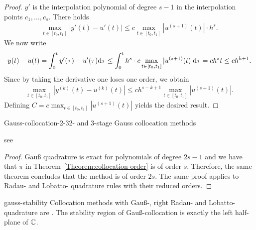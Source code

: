\begin{proof}
  $y'$ is the interpolation polynomial of degree $s-1$ in the interpolation
	points $c_1, \dots, c_s$. There holds
	\begin{gather*}
	\max_{t \in [t_0, t_1]} |y'(t) - u'(t)| \le c \max_{t \in [t_0, t_1]}
		|u^{(s+1)} (t)| \cdot h^s.
	\end{gather*}
	We now write
	\begin{gather*}
	y(t) - u(t) = \int_0 ^t y'(\tau) - u'(\tau) \mathrm{d} \tau \le \int_0 ^t h^s
		\cdot c \max_{t \in [t_0, t_1]} |u^{(s+1)} (t)| \mathrm{d} \tau = ch^s t
		\le ch^{h+1}.
	\end{gather*}
	Since by taking the derivative one loses one order, we obtain
	\begin{gather*}
	\max_{t \in [t_0, t_1]} |y^{(k)}(t) - u^{(k)}(t)| \le ch^{s-k+1}
		\max_{t \in [t_0, t_1]} |u^{(s+1)} (t)|.
	\end{gather*}
	Defining $C = c \max_{t \in [t_0, t_1]} |u^{(s+1)} (t)|$ yields the desired result.
\end{proof}




\begin{Example*}{Gauss-collocation-2-3}{2- and 3-stage Gauss collocation methods}
  \mbox{}
  \begin{minipage}[t]{.4\linewidth}
    
  \end{minipage}
  \begin{minipage}[t]{.59\linewidth}
          
  \end{minipage}
	see~\cite[Tables
  7.3, 7.4]{HairerNorsettWanner93}
\end{Example*}



\begin{proof}
  Gauß quadrature is exact for polynomials of degree $2s-1$ and we
  have that $\pi$ in Theorem~\ref{Theorem:collocation-order} is of
  order $s$. Therefore, the same theorem concludes that the method is
  of order $2s$. The same proof applies to Radau- and Lobatto-
  quadrature rules with their reduced orders.
\end{proof}

\begin{Theorem}{gauss-stability}
  Collocation methods with Gauß-, right Radau- and Lobatto-quadrature are
  . The stability region of Gauß-collocation is
  exactly the left half-plane of $\mathbb C$.
\end{Theorem}

